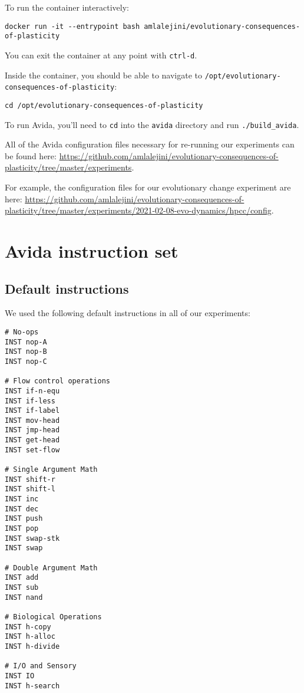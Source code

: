\documentclass[]{book}
\begin{document}
To run the container interactively:

\begin{verbatim}
docker run -it --entrypoint bash amlalejini/evolutionary-consequences-of-plasticity
\end{verbatim}

You can exit the container at any point with \texttt{ctrl-d}.

Inside the container, you should be able to navigate to \texttt{/opt/evolutionary-consequences-of-plasticity}:

\begin{verbatim}
cd /opt/evolutionary-consequences-of-plasticity
\end{verbatim}

To run Avida, you'll need to \texttt{cd} into the \texttt{avida} directory and run \texttt{./build\_avida}.

All of the Avida configuration files necessary for re-running our experiments can be found here: \url{https://github.com/amlalejini/evolutionary-consequences-of-plasticity/tree/master/experiments}.

For example, the configuration files for our evolutionary change experiment are here: \url{https://github.com/amlalejini/evolutionary-consequences-of-plasticity/tree/master/experiments/2021-02-08-evo-dynamics/hpcc/config}.

\hypertarget{avida-instruction-set}{%
\chapter{Avida instruction set}\label{avida-instruction-set}}

\hypertarget{default-instructions}{%
\section{Default instructions}\label{default-instructions}}

We used the following default instructions in all of our experiments:

\begin{verbatim}
# No-ops
INST nop-A
INST nop-B
INST nop-C

# Flow control operations
INST if-n-equ
INST if-less
INST if-label
INST mov-head
INST jmp-head
INST get-head
INST set-flow

# Single Argument Math
INST shift-r
INST shift-l
INST inc
INST dec
INST push
INST pop
INST swap-stk
INST swap

# Double Argument Math
INST add
INST sub
INST nand

# Biological Operations
INST h-copy
INST h-alloc
INST h-divide

# I/O and Sensory
INST IO
INST h-search
\end{verbatim}
\end{document}
